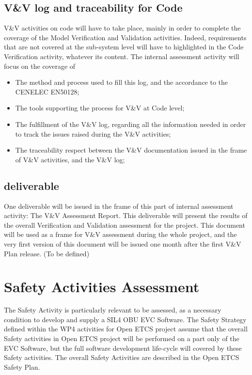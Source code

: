 \documentclass{template/openetcs_report}
\begin{document}
\subsection{V\&V log and traceability for Code}
V\&V activities on code will have to take place, mainly in order to complete the coverage of the Model Verification and Validation activities. Indeed, requirements that are not covered at the sub-system level will have to highlighted in the Code Verification activity, whatever its content.
The internal assessment activity will focus on the coverage of
\begin{itemize}
\item The method and process used to fill this log, and the accordance to the CENELEC EN50128;
\item The tools supporting the process for V\&V at Code level;
\item The fulfillment of the V\&V log, regarding all the information needed in order to track the issues raised during the V\&V activities;
\item The traceability respect between the V\&V documentation issued in the frame of V\&V activities, and the V\&V log;
\end{itemize}

\subsection{deliverable}
One deliverable will be issued in the frame of this part of internal assessment activity: The V\&V Assessment Report. This deliverable will present the results of the overall Verification and Validation assessment for the project.
This document will be used as a frame for V\&V assessment during the whole project, and the very first version of this document will be issued one month after the first V\&V Plan release. (To be defined)

\section{Safety Activities Assessment}
The Safety Activity is particularly relevant to be assessed, as a necessary condition to develop and supply a SIL4 OBU EVC Software. The Safety Strategy defined within the WP4 activities for Open ETCS project assume that the overall Safety activities in Open ETCS project will be performed on a part only of the EVC Software, but the full software development life-cycle will covered by these Safety activities.
The overall Safety Activities are described in the Open ETCS Safety Plan.
\end{document}
